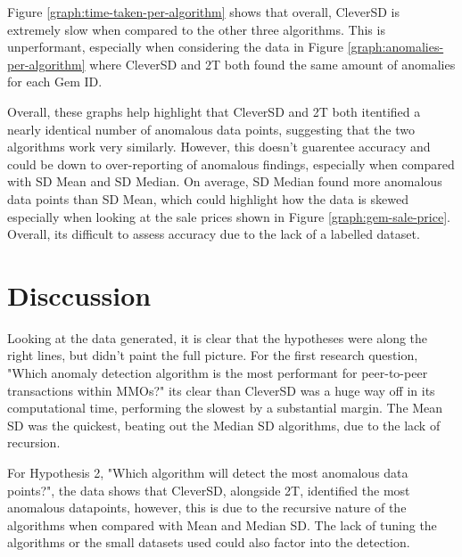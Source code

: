 \documentclass[journal]{IEEEtran}
\begin{document}
Figure \ref{graph:time-taken-per-algorithm} shows that overall, CleverSD is extremely slow when compared to the other three algorithms. This is unperformant, especially when considering the data in Figure \ref{graph:anomalies-per-algorithm} where CleverSD and 2T both found the same amount of anomalies for each Gem ID.

Overall, these graphs help highlight that CleverSD and 2T both itentified a nearly identical number of anomalous data points, suggesting that the two algorithms work very similarly. However, this doesn't guarentee accuracy and could be down to over-reporting of anomalous findings, especially when compared with SD Mean and SD Median. On average, SD Median found more anomalous data points than SD Mean, which could highlight how the data is skewed especially when looking at the sale prices shown in Figure \ref{graph:gem-sale-price}. Overall, its difficult to assess accuracy due to the lack of a labelled dataset.

\section{Disccussion}
\noindent Looking at the data generated, it is clear that the hypotheses were along the right lines, but didn't paint the full picture. For the first research question, "Which anomaly detection algorithm is the most performant for peer-to-peer transactions within MMOs?" its clear than CleverSD was a huge way off in its computational time, performing the slowest by a substantial margin. The Mean SD was the quickest, beating out the Median SD algorithms, due to the lack of recursion.

For Hypothesis 2, "Which algorithm will detect the most anomalous data points?", the data shows that CleverSD, alongside 2T, identified the most anomalous datapoints, however, this is due to the recursive nature of the algorithms when compared with Mean and Median SD. The lack of tuning the algorithms or the small datasets used could also factor into the detection.
\end{document}
